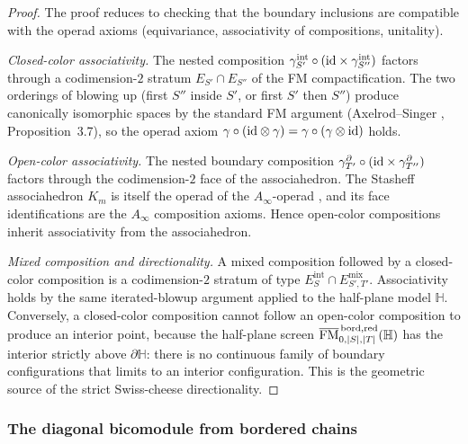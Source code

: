 \begin{proof}
The proof reduces to checking that the boundary inclusions are
compatible with the operad axioms (equivariance, associativity of
compositions, unitality).

\emph{Closed-color associativity.}
The nested composition $\gamma_{S'}^{\mathrm{int}}\circ
(\mathrm{id}\times\gamma_{S''}^{\mathrm{int}})$ factors through a
codimension-$2$ stratum $E_{S'}\cap E_{S''}$ of the FM
compactification. The two orderings of blowing up (first $S''$
inside $S'$, or first $S'$ then $S''$) produce canonically
isomorphic spaces by the standard FM argument (Axelrod--Singer
\cite{axelrod-singer}, Proposition~3.7), so the operad axiom
$\gamma\circ(\mathrm{id}\otimes\gamma)=\gamma\circ(\gamma\otimes\mathrm{id})$
holds.

\emph{Open-color associativity.}
The nested boundary composition
$\gamma_{T'}^{\partial}\circ(\mathrm{id}\times\gamma_{T''}^{\partial})$
factors through the codimension-$2$ face of the associahedron.
The Stasheff associahedron $K_m$ is itself the operad of the
$A_\infty$-operad \cite{stasheff-associahedra}, and its face
identifications are the $A_\infty$ composition axioms. Hence
open-color compositions inherit associativity from the
associahedron.

\emph{Mixed composition and directionality.}
A mixed composition followed by a closed-color composition is a
codimension-$2$ stratum of type
$E_{S}^{\mathrm{int}}\cap E_{S',T'}^{\mathrm{mix}}$. Associativity
holds by the same iterated-blowup argument applied to the
half-plane model $\mathbb H$. Conversely, a closed-color
composition cannot follow an open-color composition to produce
an interior point, because the half-plane screen
$\overline{\mathrm{FM}}^{\,\mathrm{bord},\mathrm{red}}_{0,|S|,|T|}(\mathbb H)$
has the interior strictly above $\partial\mathbb H$: there is no
continuous family of boundary configurations that limits to an
interior configuration. This is the geometric source of the
strict Swiss-cheese directionality.
\end{proof}

\subsubsection{The diagonal bicomodule from bordered chains}


